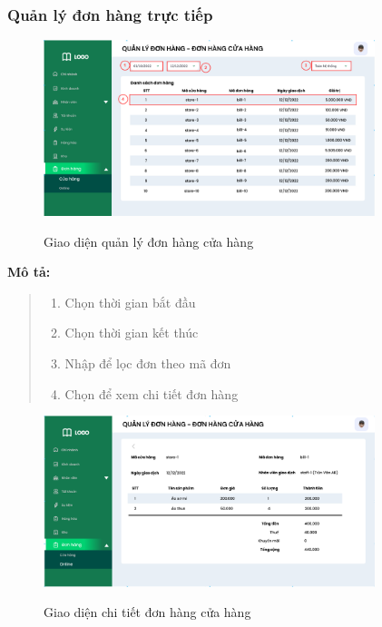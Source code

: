     
    
    \subsubsection{Quản lý đơn hàng trực tiếp}
    \begin{figure}[!htp]
        \centering
        \includegraphics[width=3.8in]{img/UI/admin/OfflineOrder.png}
        \label{42}
        \newline
        \caption{Giao diện quản lý đơn hàng cửa hàng}
    \end{figure}
    \textbf{Mô tả:}  
    \begin{quote}
        \begin{enumerate}
            \item Chọn thời gian bắt đầu
            \item Chọn thời gian kết thúc
            \item Nhập để lọc đơn theo mã đơn
            \item Chọn để xem chi tiết đơn hàng
        \end{enumerate}
    \end{quote}
        \begin{figure}[!htp]
            \centering
            \includegraphics[width=3.8in]{img/UI/admin/OfflineOrder_detai;.png}
            \label{43}
            \newline
            \caption{Giao diện chi tiết đơn hàng cửa hàng}
        \end{figure}


